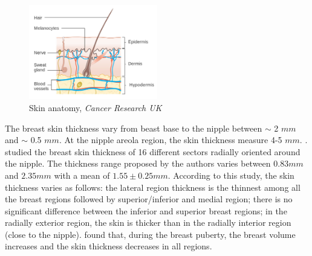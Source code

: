 \begin{figure}[!h]
\centering
\centerline{\includegraphics[width=0.5\textwidth,keepaspectratio]{figures/skin_2.jpg} }
\caption{Skin anatomy, \textit{Cancer Research UK}}
\label{fig:skinanatomy}
\end{figure}



The breast skin thickness vary from beast base to the nipple between $\sim$ 2 $mm$ and $\sim$ 0.5 $mm$. At the nipple areola region, the skin thickness measure 4-5 $mm$.
 \citep{andolina2011mammographic}. \cite{sutradhar_vivo_2013} studied the breast skin thickness of 16 different sectors radially oriented around the nipple. The thickness range proposed by the authors varies between $0.83 mm$ and $2.35 mm$ with a mean of $1.55 \pm 0.25 mm$. According to this study, the skin thickness varies as follows: the lateral
region thickness is the thinnest among all the breast regions followed by superior/inferior and medial region; there is no significant difference between the inferior and superior breast regions; in the radially exterior region, the skin is thicker than in the radially interior region (close to the nipple).  \cite{ulger2003effect} found that, during the breast puberty, the breast volume increases and the skin thickness decreases in all regions.

